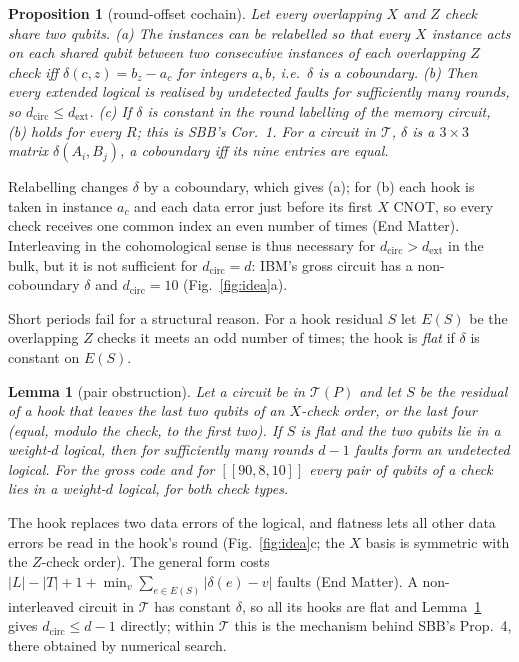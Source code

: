 \documentclass[aps,prl,twocolumn,superscriptaddress,nofootinbib]{revtex4-2}
\newif\ifshowclaimtags \showclaimtagsfalse
\newcommand{\cl}[1]{\ifshowclaimtags\textsuperscript{\textcolor{blue}{\scriptsize[#1]}}\fi}
\newcommand{\dcirc}{d_{\mathrm{circ}}}
\newcommand{\dext}{d_{\mathrm{ext}}}
\newcommand{\code}[1]{[[#1]]}
\newcommand{\T}{\mathcal{T}}
\newtheorem{proposition}[theorem]{Proposition}
\newtheorem{lemma}[theorem]{Lemma}
\begin{document}
\begin{proposition}[round-offset cochain]\label{prop:delta}
Let every overlapping $X$ and $Z$ check share two qubits. (a) The instances can be
relabelled so that every $X$ instance acts on each shared qubit between two consecutive
instances of each overlapping $Z$ check iff $\delta(c,z)=b_z-a_c$ for integers $a,b$,
i.e.\ $\delta$ is a coboundary. (b) Then every extended logical is realised by undetected
faults for sufficiently many rounds, so $\dcirc\le\dext$. (c) If $\delta$ is constant in the round
labelling of the memory circuit, (b) holds for every $R$; this is SBB's Cor.~1. For a circuit in $\T$, $\delta$ is a $3\times3$
matrix $\delta(A_i,B_j)$, a coboundary iff its nine entries are equal.
\end{proposition}
\noindent Relabelling changes $\delta$ by a coboundary, which gives (a); for (b) each
hook is taken in instance $a_c$ and each data error just before its first $X$ CNOT, so
every check receives one common index an even number of times (End Matter).
Interleaving in the cohomological sense is thus necessary for $\dcirc>\dext$ in the bulk, but it is
not sufficient for $\dcirc=d$: IBM's gross circuit has a non-coboundary $\delta$ and
$\dcirc=10$ (Fig.~\ref{fig:idea}a)\cl{L-10,L-11}.

Short periods fail for a structural reason. For a hook residual $S$ let $E(S)$ be the
overlapping $Z$ checks it meets an odd number of times; the hook is \emph{flat} if
$\delta$ is constant on $E(S)$.
\begin{lemma}[pair obstruction]\label{lem:pair}
Let a circuit be in $\T(P)$ and let $S$ be the residual of a hook that leaves the last two
qubits of an $X$-check order, or the last four (equal, modulo the check, to the first two).
If $S$ is flat and the two qubits lie in a weight-$d$ logical, then for sufficiently many
rounds $d-1$ faults form an undetected logical. For the gross code and for $\code{90,8,10}$
every pair of qubits of a check lies in a weight-$d$ logical, for both check types.
\end{lemma}
\noindent The hook replaces two data errors of the logical, and flatness lets all other
data errors be read in the hook's round (Fig.~\ref{fig:idea}c; the $X$ basis is symmetric
with the $Z$-check order). The general form costs $|L|-|T|+1+\min_v\sum_{e\in E(S)}
|\delta(e)-v|$ faults (End Matter). A non-interleaved circuit in $\T$ has constant
$\delta$, so all its hooks are flat and Lemma~\ref{lem:pair} gives $\dcirc\le d-1$
directly; within $\T$ this is the mechanism behind SBB's Prop.~4, there obtained by
numerical search\cl{L-12}.
\end{document}
